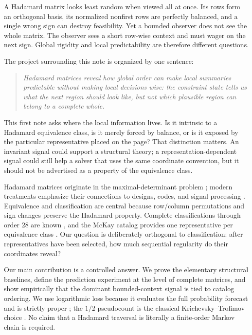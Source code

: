 \documentclass[10pt,twoside]{article}
\theoremstyle{noteplain}
\theoremstyle{definition}
\begin{document}
A Hadamard matrix looks least random when viewed all at once.  Its rows form an orthogonal basis, its normalized nonfirst rows are perfectly balanced, and a single wrong sign can destroy feasibility.  Yet a bounded observer does not see the whole matrix.  The observer sees a short row-wise context and must wager on the next sign.  Global rigidity and local predictability are therefore different questions.

The project surrounding this note is organized by one sentence:

\begin{quote}
\centering\itshape
Hadamard matrices reveal how global order can make local summaries predictable without making local decisions wise: the constraint state tells us what the next region should look like, but not which plausible region can belong to a complete whole.
\end{quote}

This first note asks where the local information lives.  Is it intrinsic to a Hadamard equivalence class, is it merely forced by balance, or is it exposed by the particular representative placed on the page?  That distinction matters.  An invariant signal could support a structural theory; a representation-dependent signal could still help a solver that uses the same coordinate convention, but it should not be advertised as a property of the equivalence class.

Hadamard matrices originate in the maximal-determinant problem \citep{hadamard1893}; modern treatments emphasize their connections to designs, codes, and signal processing \citep{horadam2007}.  Equivalence and classification are central because row/column permutations and sign changes preserve the Hadamard property.  Complete classifications through order $28$ are known \citep{spence1995}, and the McKay catalog provides one representative per equivalence class \citep{mckaydata}.  Our question is deliberately orthogonal to classification: after representatives have been selected, how much sequential regularity do their coordinates reveal?

Our main contribution is a controlled answer.  We prove the elementary structural baselines, define the prediction experiment at the level of complete matrices, and show empirically that the dominant bounded-context signal is tied to catalog ordering.  We use logarithmic loss because it evaluates the full probability forecast and is strictly proper \citep{gneitingraftery2007}; the $1/2$ pseudocount is the classical Krichevsky--Trofimov choice \citep{krichevskytrofimov1981}.  No claim that a Hadamard traversal is literally a finite-order Markov chain is required.
\end{document}
